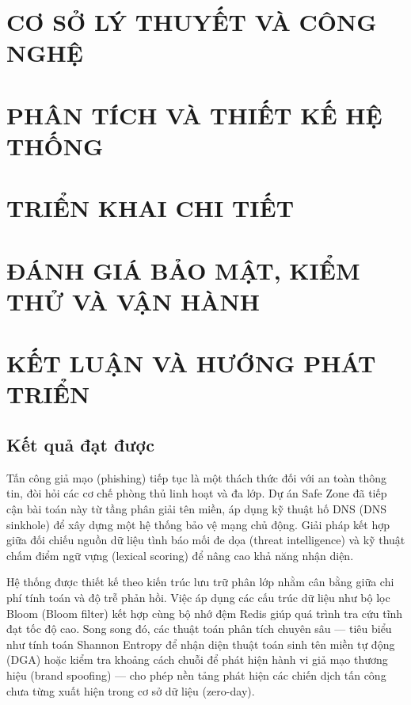 \documentclass[13pt,a4paper]{extreport}
\begin{document}
\chapter{CƠ SỞ LÝ THUYẾT VÀ CÔNG NGHỆ}




\chapter{PHÂN TÍCH VÀ THIẾT KẾ HỆ THỐNG}




\chapter{TRIỂN KHAI CHI TIẾT}




\chapter{ĐÁNH GIÁ BẢO MẬT, KIỂM THỬ VÀ VẬN HÀNH}



\newpage

\chapter*{KẾT LUẬN VÀ HƯỚNG PHÁT TRIỂN}

\section*{Kết quả đạt được}
Tấn công giả mạo (phishing) tiếp tục là một thách thức đối với an toàn thông tin, đòi hỏi các cơ chế phòng thủ linh hoạt và đa lớp. Dự án Safe Zone đã tiếp cận bài toán này từ tầng phân giải tên miền, áp dụng kỹ thuật hố DNS (DNS sinkhole) để xây dựng một hệ thống bảo vệ mạng chủ động. Giải pháp kết hợp giữa đối chiếu nguồn dữ liệu tình báo mối đe dọa (threat intelligence) và kỹ thuật chấm điểm ngữ vựng (lexical scoring) để nâng cao khả năng nhận diện.

Hệ thống được thiết kế theo kiến trúc lưu trữ phân lớp nhằm cân bằng giữa chi phí tính toán và độ trễ phản hồi. Việc áp dụng các cấu trúc dữ liệu như bộ lọc Bloom (Bloom filter) kết hợp cùng bộ nhớ đệm Redis giúp quá trình tra cứu tĩnh đạt tốc độ cao. Song song đó, các thuật toán phân tích chuyên sâu --- tiêu biểu như tính toán Shannon Entropy để nhận diện thuật toán sinh tên miền tự động (DGA) hoặc kiểm tra khoảng cách chuỗi để phát hiện hành vi giả mạo thương hiệu (brand spoofing) --- cho phép nền tảng phát hiện các chiến dịch tấn công chưa từng xuất hiện trong cơ sở dữ liệu (zero-day).
\end{document}
